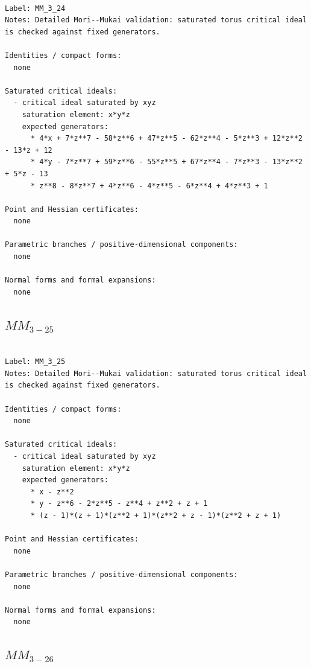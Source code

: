 \documentclass[10pt,a4paper]{article}
\begin{document}
\begin{lstlisting}

Label: MM_3_24
Notes: Detailed Mori--Mukai validation: saturated torus critical ideal is checked against fixed generators.

Identities / compact forms:
  none

Saturated critical ideals:
  - critical ideal saturated by xyz
    saturation element: x*y*z
    expected generators:
      * 4*x + 7*z**7 - 58*z**6 + 47*z**5 - 62*z**4 - 5*z**3 + 12*z**2 - 13*z + 12
      * 4*y - 7*z**7 + 59*z**6 - 55*z**5 + 67*z**4 - 7*z**3 - 13*z**2 + 5*z - 13
      * z**8 - 8*z**7 + 4*z**6 - 4*z**5 - 6*z**4 + 4*z**3 + 1

Point and Hessian certificates:
  none

Parametric branches / positive-dimensional components:
  none

Normal forms and formal expansions:
  none

\end{lstlisting}

\subsection*{$ MM_{3-25} $}

\begin{lstlisting}

Label: MM_3_25
Notes: Detailed Mori--Mukai validation: saturated torus critical ideal is checked against fixed generators.

Identities / compact forms:
  none

Saturated critical ideals:
  - critical ideal saturated by xyz
    saturation element: x*y*z
    expected generators:
      * x - z**2
      * y - z**6 - 2*z**5 - z**4 + z**2 + z + 1
      * (z - 1)*(z + 1)*(z**2 + 1)*(z**2 + z - 1)*(z**2 + z + 1)

Point and Hessian certificates:
  none

Parametric branches / positive-dimensional components:
  none

Normal forms and formal expansions:
  none

\end{lstlisting}

\subsection*{$ MM_{3-26} $}
\end{document}
